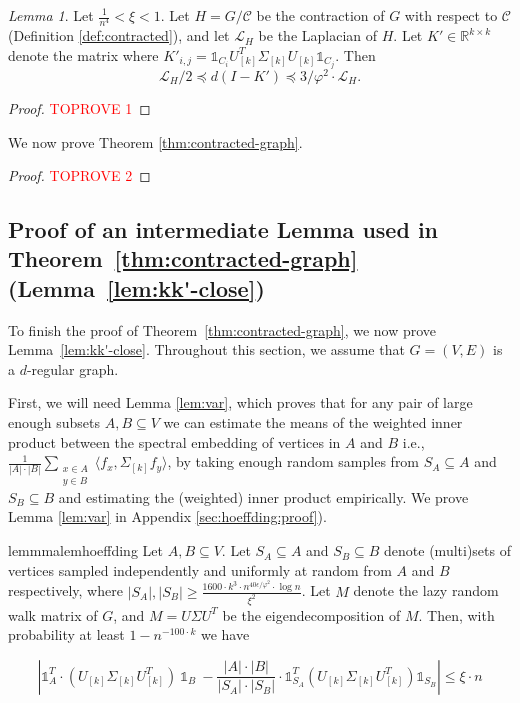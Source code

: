 \documentclass[letterpaper,11pt]{article}
\newcommand{\cC}{\mathcal{C}}
\newcommand{\cL}{\mathcal{L}}
\newcommand{\R}{\mathbb{R}}
\newcommand{\inner}[2]{\langle #1, #2 \rangle}
\theoremstyle{plain}
\theoremstyle{definition}
\theoremstyle{remark}
\newtheorem{lemmma}{Lemma}
\begin{document}
\begin{lemmma} \label{lem:k'-to-lh}
    Let $\frac{1}{n^4}<\xi<1$. Let $H=G/\cC$  be the contraction of $G$ with respect to $\cC$ (Definition \ref{def:contracted}), and let $\mathcal{L}_H$ be the Laplacian of $H$. Let $K' \in \R^{k \times k}$ denote the matrix where $K'_{i,j} = \mathds{1}_{C_i} U_{[k]}^T \Sigma_{[k]} U_{[k]} \mathds{1}_{C_j}$. Then $$\cL_H/2 \preceq d(I - K') \preceq 3/\varphi^2 \cdot \cL_H.$$
\end{lemmma}
\begin{proof}\textcolor{red}{TOPROVE 1}\end{proof}


We now prove Theorem \ref{thm:contracted-graph}.

\begin{proof}\textcolor{red}{TOPROVE 2}\end{proof}

\subsection{Proof of an intermediate Lemma used in Theorem~\ref{thm:contracted-graph} (Lemma~\ref{lem:kk'-close})} \label{sec:quadproof}

To finish the proof of Theorem~\ref{thm:contracted-graph}, we now prove Lemma~\ref{lem:kk'-close}.
Throughout this section, we assume that $G=(V,E)$ is a $d$-regular graph. 


First, we will need Lemma \ref{lem:var}, which proves that for any pair of large enough subsets $A, B \subseteq V$
we can estimate the means of the weighted inner product between  the spectral embedding of vertices in $A$ and $B$
 i.e., $\frac{1}{|A|\cdot |B|} \sum_{\substack{x \in A\\y \in B}} \inner{f_x}{\Sigma_{[k]} f_y}$, by taking enough random samples from $S_A \subseteq A$ and $S_B \subseteq B$ and estimating the 
(weighted) inner product empirically. We prove Lemma \ref{lem:var} in Appendix \ref{sec:hoeffding:proof}).

\begin{restatable}{lemmma}{lemhoeffding} \label{lem:var}
	 Let $A,B\subseteq V$. Let $S_A \subseteq A$ and $S_B \subseteq B$ denote (multi)sets of vertices sampled independently and uniformly at random from $A$ and $B$ respectively, where $|S_A|, |S_B| \geq  \frac{1600\cdot k^3\cdot n^{40 \epsilon/\varphi^2}\cdot \log n}{\xi^2}$. Let $M$ denote the lazy random walk matrix of $G$, and $M=U\Sigma U^T$ be the eigendecomposition of $M$.  Then, with probability at least $1 - n^{-100\cdot k}$ we have 

	\begin{equation} \label{eq:apx-dp}
		\left| \mathds{1}_A^T \cdot (U_{[k]}\Sigma_{[k]}U_{[k]}^T) \ 
		\mathds{1}_B \ 
		- \frac{|A|\cdot |B|}{|S_A|\cdot |S_B|}\cdot \mathds{1}_{S_A}^T (U_{[k]}\Sigma_{[k]}U_{[k]}^T) \mathds{1}_{S_B} \right| \leq \xi\cdot n
	\end{equation}
\end{restatable}
\end{document}
